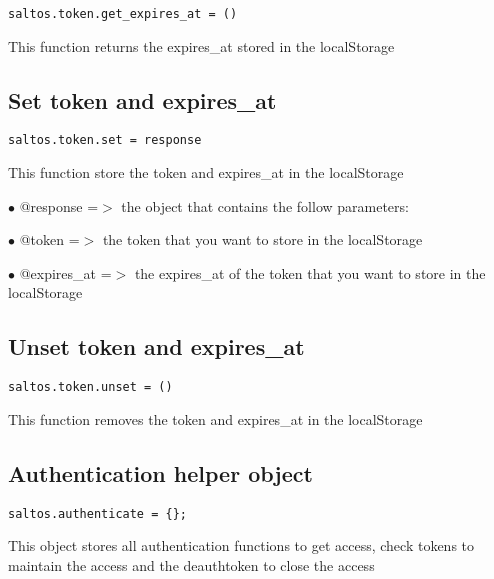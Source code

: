 \documentclass[a4paper]{book}
\begin{document}
\begin{lstlisting}
saltos.token.get_expires_at = ()
\end{lstlisting}

This function returns the expires\_at stored in the localStorage

\hypertarget{toc437}{}
\subsection{Set token and expires\_at}

\begin{lstlisting}
saltos.token.set = response
\end{lstlisting}

This function store the token and expires\_at in the localStorage

\begin{compactitem}
\item[\color{myblue}$\bullet$] @response   =$>$ the object that contains the follow parameters:
\item[\color{myblue}$\bullet$] @token      =$>$ the token that you want to store in the localStorage
\item[\color{myblue}$\bullet$] @expires\_at =$>$ the expires\_at of the token that you want to store in the localStorage
\end{compactitem}

\hypertarget{toc438}{}
\subsection{Unset token and expires\_at}

\begin{lstlisting}
saltos.token.unset = ()
\end{lstlisting}

This function removes the token and expires\_at in the localStorage

\hypertarget{toc439}{}
\subsection{Authentication helper object}

\begin{lstlisting}
saltos.authenticate = {};
\end{lstlisting}

This object stores all authentication functions to get access, check tokens to maintain
the access and the deauthtoken to close the access
\end{document}

